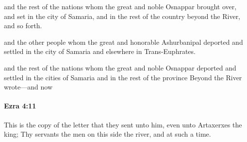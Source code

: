 			\begin{versebox}
					\item[BHS] 
					\item[LXX] 
					\item[ASV] and the rest of the nations whom the great and noble Osnappar brought over, and set in the city of Samaria, and in the rest of the country beyond the River, and so forth.
					\item[NIV] and the other people whom the great and honorable Ashurbanipal deported and settled in the city of Samaria and elsewhere in Trans-Euphrates.
					\item[NRSV] and the rest of the nations whom the great and noble Osnappar deported and settled in the cities of Samaria and in the rest of the province Beyond the River wrote—and now
			\end{versebox}

		\paragraph{Ezra 4:11} %
			\label{EZRA-4-11}

			This is the copy of the letter that they sent unto him, even unto Artaxerxes the king; Thy servants the men on this side the river, and at such a time.

